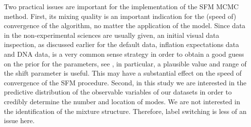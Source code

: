 \documentclass[11pt]{article}
\begin{document}
Two practical issues are important for the implementation of the SFM MCMC method. First, its mixing quality is an important indication for the (speed of) convergence of the algorithm, no matter the application of the model.  Since data in the non-experimental sciences are usually given, an initial visual data inspection, as discussed earlier for the default data, inflation expectations data and DNA data, is a very common sense strategy in order to obtain a good guess on the prior for the parameters, see \cite{fru:dea}, in particular, a plausible value and range of the shift parameter is useful. This may have a substantial effect on the speed of convergence of the SFM procedure. Second, in this study we are interested in the predictive distribution of the observable variables of our datasets in order to credibly determine the number and location of modes. We are not interested in the identification of the mixture structure. Therefore, label switching is less of an issue here. 
\end{document}
